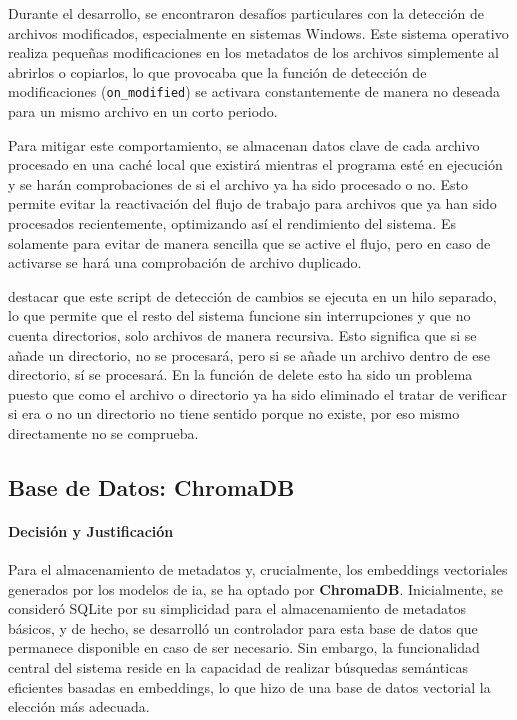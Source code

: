 Durante el desarrollo, se encontraron desafíos particulares con la detección de archivos modificados, especialmente en sistemas Windows. Este sistema operativo realiza pequeñas modificaciones en los metadatos de los archivos simplemente al abrirlos o copiarlos, lo que provocaba que la función de detección de modificaciones (\texttt{on\_modified}) se activara constantemente de manera no deseada para un mismo archivo en un corto periodo.

Para mitigar este comportamiento, se almacenan datos clave de cada archivo procesado en una caché local que existirá mientras el programa esté en ejecución y se harán comprobaciones de si el archivo ya ha sido procesado o no. Esto permite evitar la reactivación del flujo de trabajo para archivos que ya han sido procesados recientemente, optimizando así el rendimiento del sistema. Es solamente para evitar de manera sencilla que se active el flujo, pero en caso de activarse se hará una comprobación de archivo duplicado.

destacar que este script de detección de cambios se ejecuta en un hilo separado, lo que permite que el resto del sistema funcione sin interrupciones y que no cuenta directorios, solo archivos de manera recursiva. Esto significa que si se añade un directorio, no se procesará, pero si se añade un archivo dentro de ese directorio, sí se procesará. En la función de delete esto ha sido un problema puesto que como el archivo o directorio ya ha sido eliminado el tratar de verificar si era o no un directorio no tiene sentido porque no existe, por eso mismo directamente no se comprueba.

\subsection{Base de Datos: ChromaDB}
\label{subsec:decision_chromadb}
\paragraph{Decisión y Justificación}
Para el almacenamiento de metadatos y, crucialmente, los embeddings vectoriales generados por los modelos de \gls{ia}, se ha optado por \textbf{ChromaDB}. Inicialmente, se consideró SQLite por su simplicidad para el almacenamiento de metadatos básicos, y de hecho, se desarrolló un controlador para esta base de datos que permanece disponible en caso de ser necesario. Sin embargo, la funcionalidad central del sistema reside en la capacidad de realizar búsquedas semánticas eficientes basadas en embeddings, lo que hizo de una base de datos vectorial la elección más adecuada.


